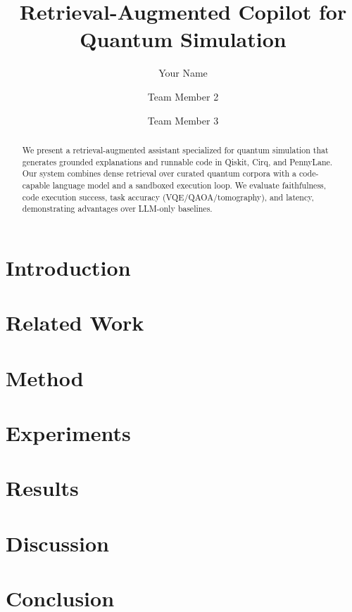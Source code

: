 \documentclass[runningheads]{llncs}
\title{Retrieval-Augmented Copilot for Quantum Simulation}
\author{Your Name \and Team Member 2 \and Team Member 3}
\institute{Your University, Department\\
\email{youremail@uni.edu}}
\begin{document}
\maketitle

\begin{abstract}
We present a retrieval-augmented assistant specialized for quantum simulation that generates grounded explanations and runnable code in Qiskit, Cirq, and PennyLane. Our system combines dense retrieval over curated quantum corpora with a code-capable language model and a sandboxed execution loop. We evaluate faithfulness, code execution success, task accuracy (VQE/QAOA/tomography), and latency, demonstrating advantages over LLM-only baselines.
\end{abstract}

\section{Introduction}

\section{Related Work}

\section{Method}

\section{Experiments}

\section{Results}

\section{Discussion}

\section{Conclusion}



\end{document}
